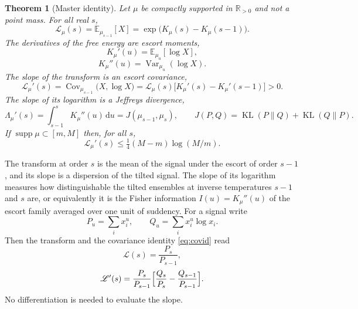 \documentclass[sn-mathphys-num]{sn-jnl}\newcommand{\SNJNL}{}
\theoremstyle{thmstyleone}
\newtheorem{theorem}{Theorem}
\theoremstyle{thmstyletwo}
\theoremstyle{thmstylethree}
\theoremstyle{thmstyleone}
\providecommand{\E}{\mathbb{E}}
\providecommand{\Var}{\operatorname{Var}}
\providecommand{\Cov}{\operatorname{Cov}}
\providecommand{\KL}{\operatorname{KL}}
\providecommand{\Rpos}{\mathbb{R}_{>0}}
\providecommand{\Leh}{\mathscr{L}}
\providecommand{\dd}{\,\mathrm{d}}
\providecommand{\supp}{\operatorname{supp}}
\begin{document}
	\begin{theorem}[Master identity]\label{thm:master}
		Let $\mu$ be compactly supported in $\Rpos$ and not a point mass.
		For all real $s$,
		\begin{equation}\label{eq:master}
			\Leh_\mu(s)=\E_{\mu_{s-1}}[X]=\exp\bigl(K_\mu(s)-K_\mu(s-1)\bigr).
		\end{equation}
		The derivatives of the free energy are escort moments,
		\begin{equation}\label{eq:Kderiv}
			K_\mu'(u)=\E_{\mu_u}[\log X],
		\end{equation}
		\begin{equation}\label{eq:Kderiv2}
			K_\mu''(u)=\Var_{\mu_u}(\log X).
		\end{equation}
		The slope of the transform is an escort covariance,
		\begin{equation}\label{eq:covid}
			\Leh_\mu'(s)=\Cov_{\mu_{s-1}}\bigl(X,\log X\bigr)
			=\Leh_\mu(s)\bigl[K_\mu'(s)-K_\mu'(s-1)\bigr]>0 .
		\end{equation}
		The slope of its logarithm is a Jeffreys divergence,
		\begin{equation}\label{eq:jeffreysslope}
			\Lambda_\mu'(s)=\int_{s-1}^{s}K_\mu''(u)\dd u=J(\mu_{s-1},\mu_s),
			\qquad
			J(P,Q)=\KL(P\|Q)+\KL(Q\|P).
		\end{equation}
		If $\supp\mu\subset[m,M]$ then, for all $s$,
		\begin{equation}\label{eq:gruss}
			\Leh_\mu'(s)\le\tfrac14(M-m)\log(M/m).
		\end{equation}
	\end{theorem}
	
	The transform at order $s$ is the mean of the signal under the escort
	of order $s-1$, and its slope is a dispersion of the tilted signal.
	The slope of its logarithm measures how distinguishable the tilted
	ensembles at inverse temperatures $s-1$ and $s$ are, or equivalently
	it is the Fisher information $I(u)=K_\mu''(u)$ of the escort family
	averaged over one unit of suddency. For a signal write
	\begin{equation}\label{eq:powersums}
		P_u=\sum_ix_i^{u},
		\qquad
		Q_u=\sum_ix_i^{u}\log x_i .
	\end{equation}
	Then the transform and the covariance identity \eqref{eq:covid} read
	\begin{equation}\label{eq:powersumslope}
		\Leh(s)=\frac{P_s}{P_{s-1}},
	\end{equation}
	\begin{equation}\label{eq:powersumslope2}
		\Leh'(s)=\frac{P_s}{P_{s-1}}\Bigl[\frac{Q_s}{P_s}-\frac{Q_{s-1}}{P_{s-1}}\Bigr].
	\end{equation}
	No differentiation is needed to evaluate the slope.
	
\end{document}
